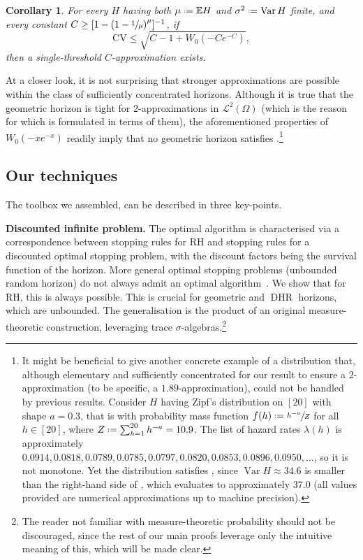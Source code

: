 \documentclass[11pt, a4paper, twoside]{article}
\newcommand*{\defeq}{\mathrel{\vcenter{\baselineskip0.5ex \lineskiplimit0pt
			\hbox{\scriptsize.}\hbox{\scriptsize.}}}=}
\newcommand{\EE}{\mathbb{E}}
\DeclareMathOperator{\DHR}{DHR}
\DeclareMathOperator{\Var}{Var}
\newtheorem{corollary}{Corollary}[section]
\numberwithin{equation}{section}
\begin{document}
	\begin{corollary}\label{largemarket}
		For every $H$ having both $\mu\defeq \EE H$ and $\sigma^2\defeq\Var H$ finite, and every constant $C\ge[1-\left(1-\sfrac{1}{\mu}\right)^{\mu}]^{-1}$, if \[\text{CV}\le \sqrt{C-1+W_0(-Ce^{-C})},\] then a single-threshold $C$-approximation exists.
	\end{corollary}
	At a closer look, it is not surprising that stronger approximations are possible within the class of sufficiently concentrated horizons. Although it is true that the geometric horizon is tight for $2$-approximations in $\mathcal{L}^2(\Omega)$ (which is the reason for which  is formulated in terms of them), the aforementioned properties of $W_0(-xe^{-x})$ readily imply that no geometric horizon satisfies .\footnote{It might be beneficial to give another concrete example of a distribution that, although elementary and sufficiently concentrated for our result to ensure a $2$-approximation (to be specific, a $1.89$-approximation), could not be handled by previous results. Consider $H$ having Zipf’s distribution on $[20]$ with shape $a = 0.3$, that is with probability mass function $f(h)\defeq \sfrac{h^{-a}}{Z}$ for all $h\in[20]$, where $Z\defeq\sum_{h=1}^{20} h^{-a} = 10.9$. The list of hazard rates $\lambda(h)$ is approximately $0.0914, 0.0818, 0.0789, 0.0785, 0.0797, 0.0820, 0.0853, 0.0896, 0.0950, \ldots$, so it is not monotone. Yet the distribution satisfies , since $\Var H\approx 34.6$ is smaller than the right-hand side of , which evaluates to approximately $37.0$ (all values provided are numerical approximations up to machine precision).}
	
	\subsection{Our techniques}\label{techniques}
	The toolbox we assembled, can be described in three key-points.
	
	\textbf{Discounted infinite problem.} The optimal algorithm is characterised via a correspondence between stopping rules for RH and stopping rules for a discounted optimal stopping problem, with the discount factors being the survival function of the horizon. More general optimal stopping problems (unbounded random horizon) do not always admit an optimal algorithm~\cite{Sam96}. We show that for RH, this is always possible. This is crucial for geometric and $\DHR$ horizons, which are unbounded. The generalisation is the product of an original measure-theoretic construction, leveraging trace $\sigma$-algebras.\footnote{The reader not familiar with measure-theoretic probability should not be discouraged, since the rest of our main proofs leverage only the intuitive meaning of this, which will be made clear.}
	
\end{document}
